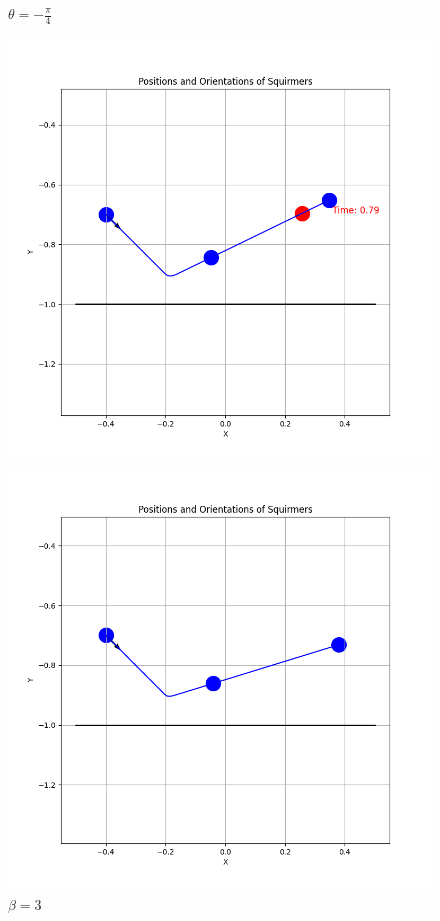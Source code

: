\documentclass{article}
\begin{document}
\begin{figure}[H]
    \centering
    \textbf{$\theta = -\frac{\pi}{4}$}\par\medskip
    \begin{minipage}{0.49\textwidth}
        \includegraphics[width=1.1\textwidth]{graphs/simulations/border/beta1_5/mpi_4.png}
        \caption{\footnotesize $\beta = 1.5$}
    \end{minipage}\hfill
    \begin{minipage}{0.49\textwidth}
        \includegraphics[width=1.1\textwidth]{graphs/simulations/border/beta3/mpi_4.png}
        \caption{\footnotesize $\beta = 3$}
    \end{minipage}
\end{figure}
\end{document}
